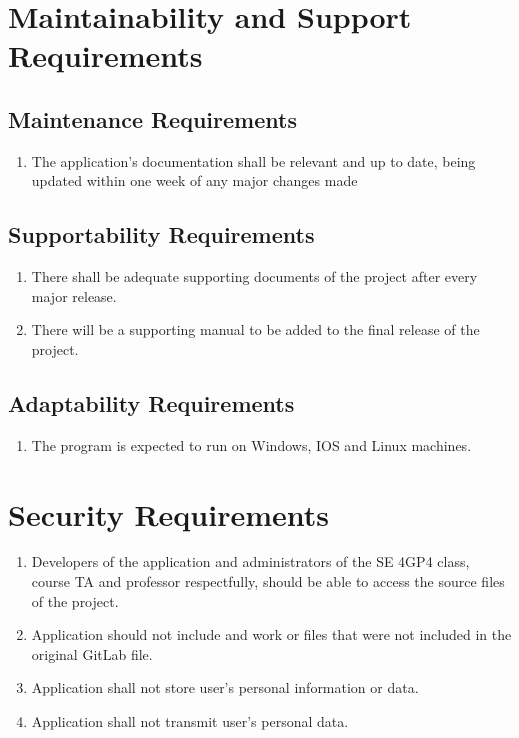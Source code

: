 \documentclass{article}
\begin{document}
\section{Maintainability and Support Requirements}
\subsection{Maintenance Requirements}
\begin{enumerate}[{MR}1. ]
	\item The application's documentation shall be relevant and up to date, being updated within one week of any major changes made
\end{enumerate}
\subsection{Supportability Requirements}
\begin{enumerate}[{SUPR}1. ]
	\item There shall be adequate supporting documents of the project after every major release.
	\item There will be a supporting manual to be added to the final release of the project.
\end{enumerate}
\subsection{Adaptability Requirements}
\begin{enumerate}[{AR}1. ]
	\item The program is expected to run on Windows, IOS and Linux machines.
\end{enumerate}
\section{Security Requirements}
\begin{enumerate}[{SR}1. ]
	\item Developers of the application and administrators of the SE 4GP4 class, course TA and professor respectfully, should be able to access the source files of the project.
	\item Application should not include and work or files that were not included in the original GitLab file.
	\item Application shall not store user's personal information or data.
	\item Application shall not transmit user's personal data.
\end{enumerate}
\end{document}
